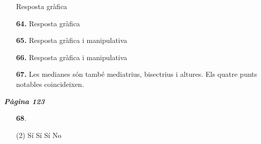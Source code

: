 \documentclass[a4paper, pdf, twoside]{book}
\begin{document}
\begin{multicols}{2}
\begin{enumerate}
Resposta gràfica
\vspace{0.25cm}
\item[\fontfamily{phv}\selectfont\color{blue}\textbf{64. }] 
Resposta gràfica
\vspace{0.25cm}
\item[\fontfamily{phv}\selectfont\color{blue}\textbf{65. }] 
Resposta gràfica i manipulativa
\vspace{0.25cm}
\item[\fontfamily{phv}\selectfont\color{blue}\textbf{66. }] 
Resposta gràfica i manipulativa
\vspace{0.25cm}
\item[\fontfamily{phv}\selectfont\color{blue}\textbf{67. }] 
 Les medianes són també mediatrius, bisectrius i altures. Els quatre punts notables coincideixen.
 \end{enumerate}
\vspace{0.3cm}


{\textbf{\em Pàgina 123}} \hrulefill
\begin{enumerate}
\vspace{0.25cm}



 \item[\fontfamily{phv}\selectfont\color{blue}\textbf{68}. ] 
 \begin{tasks}[column-sep=1em, item-indent=1.3333em](2)
	 \task Sí
	 \task Sí
	 \task Sí
	 \task No
\end{tasks}
 \end{enumerate}
\begin{enumerate}
\vspace{0.25cm}




\end{enumerate}
\end{multicols}
\end{document}
